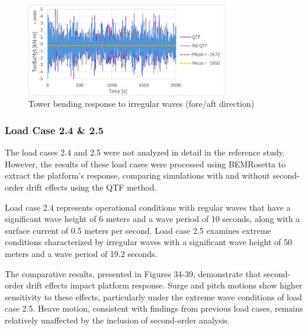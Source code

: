 \documentclass[a4paper, 11pt]{article}
\begin{document}
\begin{figure}[H]
    \centering
    \includegraphics[width=0.78\textwidth]{2.2_twr.png}
    \caption{\small Tower bending response to irregular waves (fore/aft direction)}
    \label{fig:2.2_twr}
\end{figure}

\subsubsection{Load Case 2.4 \& 2.5}
\hspace{0.5cm}The load cases 2.4 and 2.5 were not analyzed in detail in the reference study. However, the results of these load cases were processed using BEMRosetta to extract the platform's response, comparing simulations with and without second-order drift effects using the QTF method.

Load case 2.4 represents operational conditions with regular waves that have a significant wave height of 6 meters and a wave period of 10 seconds, along with a surface current of 0.5 meters per second. Load case 2.5 examines extreme conditions characterized by irregular waves with a significant wave height of 50 meters and a wave period of 19.2 seconds.

The comparative results, presented in Figures 34-39, demonstrate that second-order drift effects impact platform response. Surge and pitch motions show higher sensitivity to these effects, particularly under the extreme wave conditions of load case 2.5. Heave motion, consistent with findings from previous load cases, remains relatively unaffected by the inclusion of second-order analysis.
\end{document}
